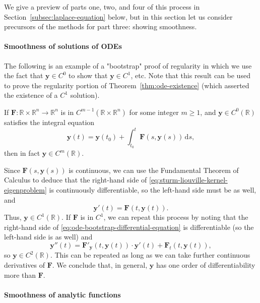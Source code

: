 We give a preview of parts one, two, and four of this process in Section~\ref{subsec:laplace-equation} below, but in this section let us consider precursors of the methods for part three: showing smoothness.

\paragraph*{Smoothness of solutions of ODEs}

The following is an example of a "bootstrap" proof of regularity in which we use the fact that $\bm{y}\in C^0$ to show that $\bm{y}\in C^1$, etc. Note that this result can be used to prove the regularity portion of Theorem~\ref{thm:ode-existence} (which asserted the existence of a $C^1$ solution).

\begin{Theorem}
\label{thm:ode-bootstrap-regularity}
If $\bm{F}:\mathbb{R}\times\mathbb{R}^n\to\mathbb{R}^n$ is in $C^{m-1}(\mathbb{R}\times\mathbb{R}^n)$ for some integer $m\geq1$, and $\bm{y}\in C^0(\mathbb{R})$ satisfies the integral equation
\begin{equation}\label{eq:ode-bootstrap-integral-equation}
\bm{y}(t)=\bm{y}(t_0)+\int_{t_0}^t\bm{F}(s,\bm{y}(s))\,\mathrm{d}s,
\end{equation}
then in fact $\bm{y}\in C^m(\mathbb{R})$.
\end{Theorem}

\begin{Proof}
Since $\bm{F}(s,\bm{y}(s))$ is continuous, we can use the Fundamental Theorem of Calculus to deduce that the right-hand side of \eqref{eq:sturm-liouville-kernel-eigenproblem} is continuously differentiable, so the left-hand side must be as well, and
\begin{equation}\label{eq:ode-bootstrap-differential-equation}
\bm{y}'(t)=\bm{F}(t,\bm{y}(t)).
\end{equation}
Thus, $\bm{y}\in C^1(\mathbb{R})$. If $\bm{F}$ is in $C^1$, we can repeat this process by noting that the right-hand side of \eqref{eq:ode-bootstrap-differential-equation} is differentiable (so the left-hand side is as well) and
\[
\bm{y}''(t)=\bm{F}'_{\bm{y}}(t,\bm{y}(t))\cdot\bm{y}'(t)+\bm{F}_t(t,\bm{y}(t)),
\]
so $\bm{y}\in C^2(\mathbb{R})$. This can be repeated as long as we can take further continuous derivatives of $\bm{F}$. We conclude that, in general, $\bm{y}$ has one order of differentiability more than $\bm{F}$.
\end{Proof}

\paragraph*{Smoothness of analytic functions}

